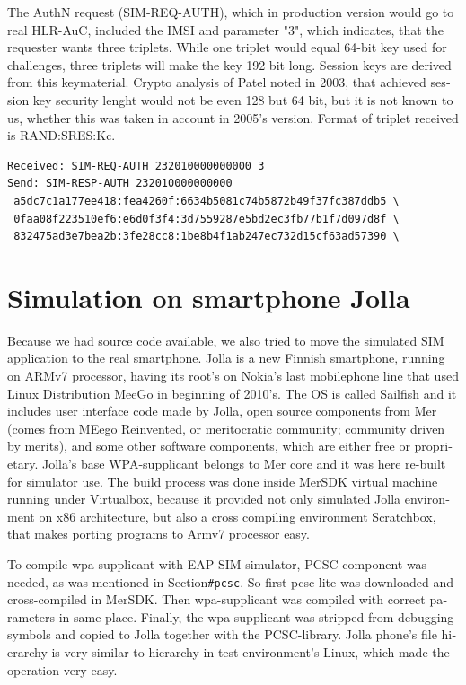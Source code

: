 \documentclass[12pt,a4paper,english]{tutthesis}
\begin{document}
\begin{otherlanguage}{english}
The AuthN request (SIM-REQ-AUTH), which in production version would go
to real HLR-AuC, included the IMSI and parameter "3", which indicates,
that the requester wants three triplets.  
While one triplet would equal 64-bit key used for challenges, three
triplets will make the key 192 bit long. Session keys are derived from
this keymaterial. Crypto analysis of Patel\cite{patel-sim} noted in
2003, that achieved session key security lenght would not be even 128
but 64 bit, but it is not known to us, whether this was taken in
account in 2005's version. 
Format of triplet received is RAND:SRES:Kc.

\scriptsize
\begin{verbatim}
Received: SIM-REQ-AUTH 232010000000000 3
Send: SIM-RESP-AUTH 232010000000000 
 a5dc7c1a177ee418:fea4260f:6634b5081c74b5872b49f37fc387ddb5 \
 0faa08f223510ef6:e6d0f3f4:3d7559287e5bd2ec3fb77b1f7d097d8f \
 832475ad3e7bea2b:3fe28cc8:1be8b4f1ab247ec732d15cf63ad57390 \
\end{verbatim}
\normalsize


\section{Simulation on smartphone Jolla}
\label{sec-5-3}

Because we had source code available, we also tried to move the
simulated SIM application to the real smartphone.  Jolla is a new
Finnish smartphone, running on ARMv7 processor, having its root's on
Nokia's last mobilephone line that used Linux Distribution MeeGo in
beginning of 2010's.  The OS is called Sailfish and it includes user
interface code made by Jolla, open source components from Mer (comes
from MEego
Reinvented, or meritocratic community; community driven by merits), and some other software
components, which are either free or proprietary.  Jolla's base
WPA-supplicant belongs to Mer core and it was here re-built for
simulator use. The build process was done inside MerSDK virtual
machine running under Virtualbox, because it provided not only
simulated Jolla environment on x86 architecture, but also a cross
compiling environment Scratchbox, that makes porting programs to Armv7
processor easy.

To compile wpa-supplicant with EAP-SIM simulator, PCSC component was
needed, as was mentioned in Section\texttt{\#pcsc}. So first pcsc-lite was
downloaded and cross-compiled in MerSDK. Then wpa-supplicant was compiled
with correct parameters in same place. Finally, the wpa-supplicant was 
stripped from debugging symbols and copied to Jolla together with the PCSC-library.
Jolla phone's file hierarchy is very similar to hierarchy in test
environment's Linux, which made the operation very easy.




\end{otherlanguage}
\end{document}

